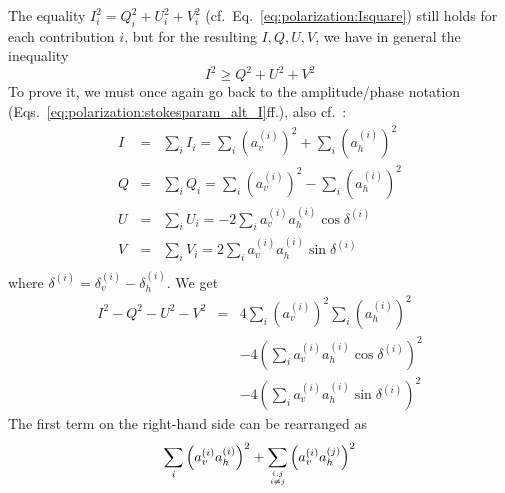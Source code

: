 The equality $I_i^2 = Q_i^2 + U_i^2 + V_i^2$
(cf.~Eq.~\ref{eq:polarization:Isquare}) still holds for each
contribution $i$, but for the resulting $I,Q,U,V$, we have in general the
inequality
\begin{equation}
 \label{eq:polarization:stokes_inequality}
  I^2 \geq Q^2 + U^2 + V^2
\end{equation}
To prove it, we must once again go back to the amplitude/phase
notation (Eqs.~\ref{eq:polarization:stokesparam_alt_I}ff.), also
cf.~\citet[][chap.~I.15]{chandrasekhar:60}:
\begin{eqnarray}
I &=& \sum_i I_i = \sum_i \left(a_v^{(i)}\right)^2
                    + \sum_i \left(a_h^{(i)}\right)^2 \\
Q &=& \sum_i Q_i = \sum_i \left(a_v^{(i)}\right)^2
                    - \sum_i \left(a_h^{(i)}\right)^2 \\
U &=& \sum_i U_i = - 2 \sum_i a_v^{(i)} a_h^{(i)} \cos\delta^{(i)} \\
 V &=& \sum_i V_i = 2 \sum_i a_v^{(i)} a_h^{(i)} \sin\delta^{(i)} \\
\end{eqnarray}
where $\delta^{(i)} = \delta_v^{(i)} - \delta_h^{(i)}$. 
We get
\begin{eqnarray}
\label{eq:polarization:square-difference}  
I^2 - Q^2 - U^2 - V^2 &=& 
  4 \sum_i \left(a_v^{(i)}\right)^2
                     \sum_i \left(a_h^{(i)}\right)^2 \\ \nonumber
  &&- 4 \left( \sum_i a_v^{(i)} a_h^{(i)} \cos\delta^{(i)} \right)^2
  \\ \nonumber
  &&- 4 \left( \sum_i a_v^{(i)} a_h^{(i)} \sin\delta^{(i)} \right)^2 
\end{eqnarray}
The first term on the right-hand side can be rearranged as
\begin{equation}
  \sum_i \left(a_v^{(i)}a_h^{(i)}\right)^2
  + \sum_{{i,j}\atop{i\not=j}} \left(a_v^{(i)}a_h^{(j)}\right)^2
\end{equation}
